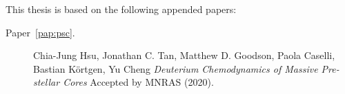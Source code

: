 
\begin{refsection}

This thesis is based on the following appended papers:

\begin{description}
\item[Paper~\ref{pap:psc}.] Chia-Jung Hsu, Jonathan C. Tan, Matthew D. Goodson, Paola Caselli, Bastian K\"{o}rtgen, Yu Cheng \emph{Deuterium Chemodynamics of Massive Pre-stellar Cores} Accepted by MNRAS (2020).

\end{description}








\end{refsection}
